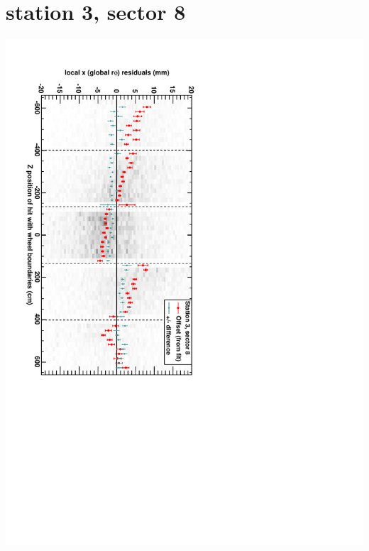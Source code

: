 \documentclass[compress]{beamer}
\begin{document}
\section*{station 3, sector 8}
\begin{frame} \vfill \mbox{\hspace{-1 cm}\includegraphics[height=1.2\linewidth, angle=90]{DTrphiVsZ_st3_sr08.pdf}} \end{frame}
\end{document}
